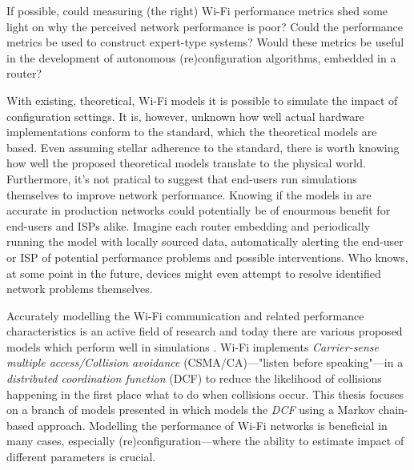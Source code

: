 If possible, could measuring (the right) Wi-Fi performance metrics shed some
light on why the perceived network performance is poor? Could the performance
metrics be used to construct expert-type systems? Would these metrics be
useful in the development of autonomous (re)configuration algorithms, embedded
in a router?




With existing, theoretical, Wi-Fi models it is possible to simulate the impact
of configuration settings. It is, however, unknown how well actual hardware
implementations conform to the standard, which the theoretical models are
based. Even assuming stellar adherence to the standard, there is worth knowing
how well the proposed theoretical models translate to the physical world.
Furthermore, it's not pratical to suggest that end-users run simulations
themselves to improve network performance. Knowing if the models in
\cite{felemban} are accurate in production networks could potentially be of
enourmous benefit for end-users and ISPs alike. Imagine each router embedding
and periodically running the model with locally sourced data, automatically
alerting the end-user or ISP of potential performance problems and possible
interventions. Who knows, at some point in the future, devices might even
attempt to resolve identified network problems themselves.




Accurately modelling the Wi-Fi communication and related performance
characteristics is an active field of research and today there are various
proposed models which perform well in simulations
\cite{bianchi}\cite{felemban}. Wi-Fi implements \emph{Carrier-sense multiple
access/Collision avoidance} (CSMA/CA)—"listen before speaking"—in a
\emph{distributed coordination function} (DCF) to reduce the likelihood of
collisions happening in the first place what to do when collisions occur.
This thesis focuses on a branch of models presented in \cite{bianchi} which
models the \emph{DCF} using a Markov chain-based approach. Modelling the
performance of Wi-Fi networks is beneficial in many cases, especially
(re)configuration—where the ability to estimate impact of different parameters
is crucial.


